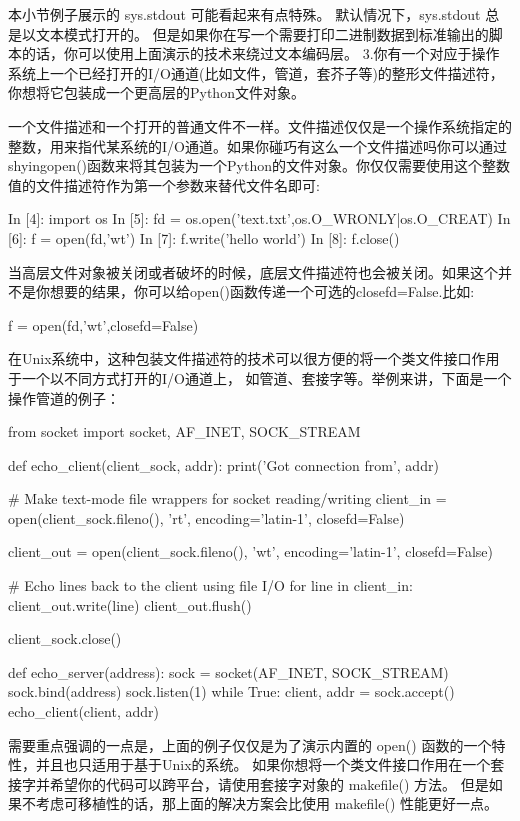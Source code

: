 本小节例子展示的 sys.stdout 可能看起来有点特殊。 默认情况下，sys.stdout 总是以文本模式打开的。 但是如果你在写一个需要打印二进制数据到标准输出的脚本的话，你可以使用上面演示的技术来绕过文本编码层。
3.你有一个对应于操作系统上一个已经打开的I/O通道(比如文件，管道，套芥子等)的整形文件描述符，你想将它包装成一个更高层的Python文件对象。\par
一个文件描述和一个打开的普通文件不一样。文件描述仅仅是一个操作系统指定的整数，用来指代某系统的I/O通道。如果你碰巧有这么一个文件描述吗你可以通过shyingopen()函数来将其包装为一个Python的文件对象。你仅仅需要使用这个整数值的文件描述符作为第一个参数来替代文件名即可:
\begin{python}
In [4]: import os
In [5]: fd = os.open('text.txt',os.O_WRONLY|os.O_CREAT)
In [6]: f = open(fd,'wt')
In [7]: f.write('hello world\n')
In [8]: f.close()
\end{python}
当高层文件对象被关闭或者破坏的时候，底层文件描述符也会被关闭。如果这个并不是你想要的结果，你可以给open()函数传递一个可选的closefd=False.比如:
\begin{python}
f = open(fd,'wt',closefd=False)
\end{python}
在Unix系统中，这种包装文件描述符的技术可以很方便的将一个类文件接口作用于一个以不同方式打开的I/O通道上， 如管道、套接字等。举例来讲，下面是一个操作管道的例子：
\begin{python}
from socket import socket, AF_INET, SOCK_STREAM

def echo_client(client_sock, addr):
    print('Got connection from', addr)

    # Make text-mode file wrappers for socket reading/writing
    client_in = open(client_sock.fileno(), 'rt', encoding='latin-1',
                closefd=False)

    client_out = open(client_sock.fileno(), 'wt', encoding='latin-1',
                closefd=False)

    # Echo lines back to the client using file I/O
    for line in client_in:
        client_out.write(line)
        client_out.flush()

    client_sock.close()

def echo_server(address):
    sock = socket(AF_INET, SOCK_STREAM)
    sock.bind(address)
    sock.listen(1)
    while True:
        client, addr = sock.accept()
        echo_client(client, addr)
\end{python}
需要重点强调的一点是，上面的例子仅仅是为了演示内置的 open() 函数的一个特性，并且也只适用于基于Unix的系统。 如果你想将一个类文件接口作用在一个套接字并希望你的代码可以跨平台，请使用套接字对象的 makefile() 方法。 但是如果不考虑可移植性的话，那上面的解决方案会比使用 makefile() 性能更好一点。

